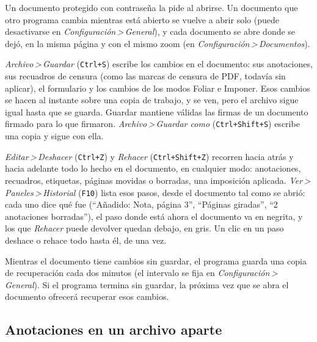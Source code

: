 \documentclass[12pt,
              article,
              oneside
              ]{memoir}
\newcommand*{\menu}[1]{\textit{#1}}
\newcommand*{\then}{\,>\,}
\newcommand*{\key}[1]{\texttt{#1}}
\begin{document}
%
Un documento protegido con contraseña la pide al abrirse. Un documento que
otro programa cambia mientras está abierto se vuelve a abrir solo (puede
desactivarse en \menu{Configuración\then General}), y cada documento se
abre donde se dejó, en la misma página y con el mismo zoom (en
\menu{Configuración\then Documentos}).

%
\menu{Archivo\then Guardar} (\key{Ctrl+S}) escribe los cambios en el
documento: sus anotaciones, sus recuadros de censura (como las marcas de
censura de PDF, todavía sin aplicar), el formulario y los cambios de los
modos Foliar e Imponer. Esos cambios se hacen al instante sobre una copia
de trabajo, y se ven, pero el archivo sigue igual hasta que se guarda.
Guardar mantiene válidas las firmas de un documento firmado para lo que
firmaron. \menu{Archivo\then Guardar como} (\key{Ctrl+Shift+S}) escribe una
copia y sigue con ella.

%
\menu{Editar\then Deshacer} (\key{Ctrl+Z}) y \menu{Rehacer}
(\key{Ctrl+Shift+Z}) recorren hacia atrás y hacia adelante todo lo hecho
en el documento, en cualquier modo: anotaciones, recuadros, etiquetas,
páginas movidas o borradas, una imposición aplicada.
%
\menu{Ver\then Paneles\then Historial} (\key{F10}) lista esos pasos, desde el
documento tal como se abrió: cada uno dice qué fue (\enquote{Añadido: Nota,
página 3}, \enquote{Páginas giradas}, \enquote{2 anotaciones borradas}), el
paso donde está ahora el documento va en negrita, y los que \menu{Rehacer}
puede devolver quedan debajo, en gris. Un clic en un paso deshace o rehace
todo hasta él, de una vez.

%
Mientras el documento tiene cambios sin guardar, el programa guarda una
copia de recuperación cada dos minutos (el intervalo se fija en
\menu{Configuración\then General}). Si el programa termina sin guardar, la
próxima vez que se abra el documento ofrecerá recuperar esos cambios.

\subsection{Anotaciones en un archivo aparte}
\label{sec:apart}
\end{document}
